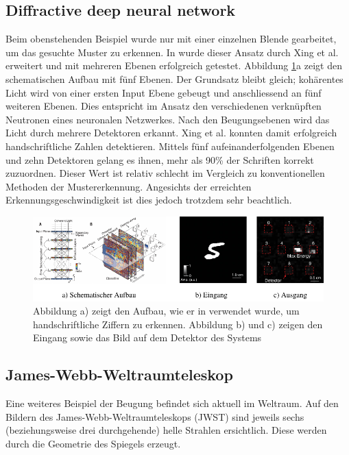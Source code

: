 \subsection{Diffractive deep neural network}
Beim obenstehenden Beispiel wurde nur mit einer einzelnen Blende gearbeitet, um das gesuchte Muster zu erkennen.
In \cite{opt:Lin.2018} wurde dieser Ansatz durch Xing et al. erweitert und mit mehreren Ebenen erfolgreich getestet.
Abbildung \ref{opt:fig:handwriting}a zeigt den schematischen Aufbau mit fünf Ebenen.
Der Grundsatz bleibt gleich; kohärentes Licht wird von einer ersten Input Ebene gebeugt und anschliessend an fünf weiteren Ebenen.
Dies entspricht im Ansatz den verschiedenen verknüpften Neutronen eines neuronalen Netzwerkes.
Nach den Beugungsebenen wird das Licht durch mehrere Detektoren erkannt.
Xing et al. konnten damit erfolgreich handschriftliche Zahlen detektieren.
Mittels fünf aufeinanderfolgenden Ebenen und zehn Detektoren gelang es ihnen, mehr als 90\% der Schriften korrekt zuzuordnen.
Dieser Wert ist relativ schlecht im Vergleich zu konventionellen Methoden der Mustererkennung.
Angesichts der erreichten Erkennungsgeschwindigkeit ist dies jedoch trotzdem sehr beachtlich.

\begin{figure}
    \centering
    \includegraphics[width=\textwidth]{papers/opt/images/handwriting.pdf}
    \caption{Abbildung a) zeigt den Aufbau, wie er in \cite{opt:Lin.2018} verwendet wurde, um handschriftliche Ziffern zu erkennen.
    Abbildung b) und c) zeigen den Eingang sowie das Bild auf dem Detektor des Systems}
    \label{opt:fig:handwriting}
\end{figure}

\subsection{James-Webb-Weltraumteleskop}
Eine weiteres Beispiel der Beugung befindet sich aktuell im Weltraum.
Auf den Bildern des James-Webb-Weltraumteleskops (JWST) sind jeweils sechs (beziehungsweise drei durchgehende) helle Strahlen ersichtlich.
Diese werden durch die Geometrie des Spiegels erzeugt.

